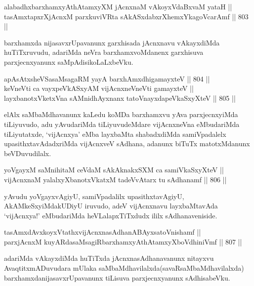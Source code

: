 \begin{shl}
alabadhxbarxhamxyAthAtamxyXM jAcnxnaM vAkoyxVdaBxvaM yataH || \\
tasAmxtapxrXjAcnxM parxkuviVRta sAkASxdabxrXhemxYkagoVcarAmf \hfill || 803 ||  
\end{shl}

\begin{artha}
barxhamxda nijasavxrUpavanunx garxhisada jAcnxnavu vAkayxdiMda huTiTxruvudu, adariMda neVra barxhamxvoMdanenx garxhisuva parxjecnxyanunx saMpAdisikoLaLxbeVku.
\end{artha}


\begin{shl}
apAsAtxsheVSasaMsagaRM yayA barxhAmxdhigamayxteV \hfill || 804 ||  \\
keVneVti ca vayxpeVkASxyAM vijAcnxneVneVti gamayxteV || \\
layxbanotxVketxVna sAMnidhAyxnanx tatoV\s nayxdapeVkaSxyXteV \hfill || 805 ||  
\end{shl}

\begin{artha}
elAlx saMbaMdhavanunx kaLedu koMDa barxhamxvu yAva parxjecnxyiMda tiLiyuvudo, adu yAvudariMda tiLiyuvudeMdare vijAcnxneVna eMbudariMda tiLiyutatxde, `vijAcnxya' eMba layxbaMta shabadxdiMda samiVpadalelx upasithxtavAdadxriMda vijAcnxveV sAdhana, adanunx biTuTx matotxMdanunx beVDuvudilalx.
\end{artha}

\begin{shl}
yoVgayxM saMnihitaM ceVdaM sAkAknakxSXM ca samiVkaSxyXteV ||  \\
vijAcnxnaM yalalxyXbanotxVkatxM tadeVvAtarx tu sAdhanamf \hfill || 806 ||  
\end{shl}

\begin{artha}
yAvudu yoVgayxvAgiyU, samiVpadalilx upasithxtavAgiyU, AkAMkeSxyiMdakUDiyU iruvudo, adeV vijAcnxnavu layxbaMtavAda `vijAcnxya!' eMbudariMda heVLalapxTiTxdudx ililx sAdhanaveniside.
\end{artha}

\begin{shl}
tasAmxdAvxkoyxVtathxvijAcnxnasAdhanABAyxsatoV\s nishamf || \\
parxjAcnxM kuyARdasaMsagiRbarxhamxyAthAtamxyXboVdhiniVmf \hfill || 807 ||  
\end{shl}

\begin{artha}
adariMda vAkayxdiMda huTiTxda jAcnxnasAdhanavanunx nitayxvu AvaqtitxmADuvudara mUlaka saMbaMdhavilalxda(savaRsaMbaMdhavilalxda) barxhamxdanijasavxrUpavanunx tiLisuva parxjecnxyanunx sAdhisabeVku.
\end{artha}

